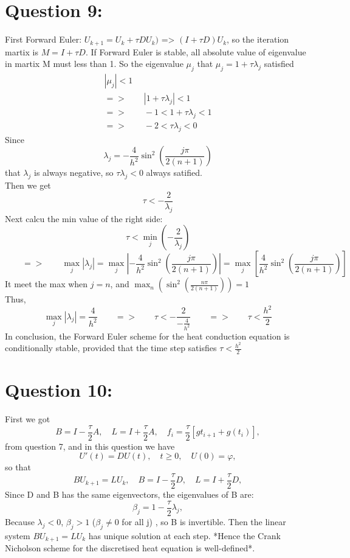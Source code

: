 \documentclass[11pt]{article}
\begin{document}
    \section*{Question 9:}
    First Forward Euler: $U_{k+1} = U_{k} + {\tau}DU_{k})$ => $(I + {\tau}D)U_{k}$, so the iteration martix is $M = I + {\tau}D$.
    If Forward Euler is stable, all absolute value of eigenvalue in martix M must less than 1. So the eigenvalue $\mu_j$ that $\mu_j = 1 + \tau \lambda_j$ satisfied
    \begin{align*}
        |\mu_j| < 1 \\
        => \qquad |1 + \tau \lambda_j| < 1 \\
        => \qquad -1 < 1 + \tau \lambda_j < 1\\
        => \qquad -2 < \tau \lambda_j < 0
    \end{align*}
    Since
    \[
        \lambda_j = -\frac{4}{h^2}\sin^2\left(\frac{j\pi}{2(n+1)}\right)
    \]
    that $\lambda_j$ is always negative, so $\tau \lambda_j < 0$ always satified.\\
    Then we get
    \[
       \tau < -\frac{2}{\lambda_j}
    \]
    Next calcu the min value of the right side:
    \[
        \tau < \min_j\left( -\frac{2}{\lambda_j}\right)
    \]
    \[
        \qquad => \qquad \max_j |\lambda_j| = \max_j \left|-\frac{4}{h^2}\sin^2\left(\frac{j\pi}{2(n+1)}\right)\right| = \max_j \left[\frac{4}{h^2}\sin^2\left(\frac{j\pi}{2(n+1)}\right)\right]
    \]
    It meet the max when $j=n$, and $\max_n\left(\sin^2\left(\frac{n\pi}{2(n+1)}\right)\right) = 1$\\
    Thus,
    \[
        \max_j |\lambda_j| = \frac{4}{h^2} \qquad=>\qquad  \tau < -\frac{2}{-\frac{4}{h^2}} \qquad=>\qquad \tau < \frac{h^2}{2}
    \]
    In conclusion, the Forward Euler scheme for the heat conduction equation is conditionally stable, provided that the time step satisfies $\tau < \frac{h^2}{2}$


    \section*{Question 10:}
    First we got
     \[
        B = I - \frac{\tau}{2}A, \quad L = I + \frac{\tau}{2}A, \quad f_{i} = \frac{\tau}{2}[g{t_{i+1}} + g(t_{i})],
     \]
    from question 7, and in this question we have
    \[
        U'(t) = DU(t), \quad t \geq 0, \quad U(0) = \varphi,
    \]
    so that
    \[
        BU_{k+1} = LU_k, \quad B = I - \frac{\tau}{2}D, \quad L = I + \frac{\tau}{2}D,
    \]
    Since D and B has the same eigenvectors, the eigenvalues of B are:
    \[
        \beta_j = 1-\frac{\tau}{2}\lambda_j,
    \]
    Because $\lambda_j < 0$, $\beta_j > 1$ ($\beta_j \not= 0$ for all j) , so B is invertible. Then the linear system $BU_{k+1} = LU_k$ has unique solution at each step.
    *Hence the Crank Nicholson scheme for the discretised heat equation is well-defined*.\\
\end{document}
